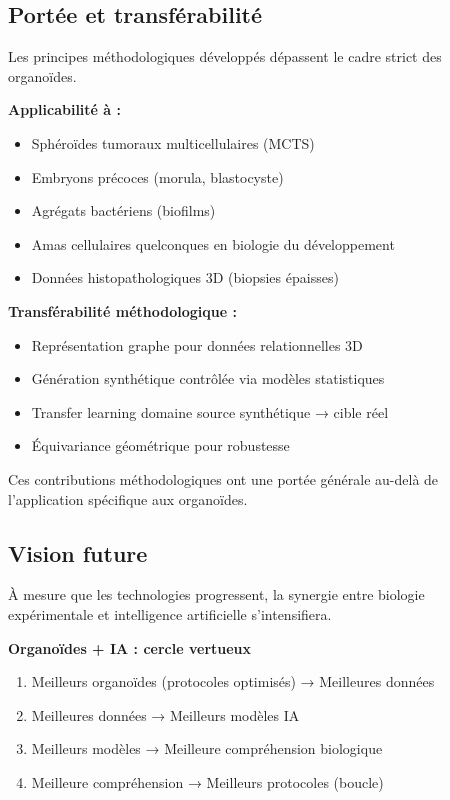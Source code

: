 \subsection{Portée et transférabilité}

Les principes méthodologiques développés dépassent le cadre strict des organoïdes.

\textbf{Applicabilité à :}
\begin{itemize}
    \item Sphéroïdes tumoraux multicellulaires (MCTS)
    \item Embryons précoces (morula, blastocyste)
    \item Agrégats bactériens (biofilms)
    \item Amas cellulaires quelconques en biologie du développement
    \item Données histopathologiques 3D (biopsies épaisses)
\end{itemize}

\textbf{Transférabilité méthodologique :}
\begin{itemize}
    \item Représentation graphe pour données relationnelles 3D
    \item Génération synthétique contrôlée via modèles statistiques
    \item Transfer learning domaine source synthétique → cible réel
    \item Équivariance géométrique pour robustesse
\end{itemize}

Ces contributions méthodologiques ont une portée générale au-delà de l'application spécifique aux organoïdes.

\subsection{Vision future}

À mesure que les technologies progressent, la synergie entre biologie expérimentale et intelligence artificielle s'intensifiera.

\textbf{Organoïdes + IA : cercle vertueux}
\begin{enumerate}
    \item Meilleurs organoïdes (protocoles optimisés) → Meilleures données
    \item Meilleures données → Meilleurs modèles IA
    \item Meilleurs modèles → Meilleure compréhension biologique
    \item Meilleure compréhension → Meilleurs protocoles (boucle)
\end{enumerate}

